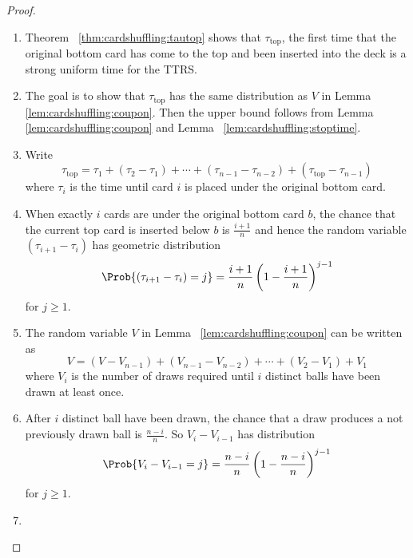 \documentclass[12pt]{article}
\begin{document}
\begin{proof}
    \begin{enumerate}
        \item
            Theorem~%
            \ref{thm:cardshuffling:tautop} shows that \( \tau_{\text{top}}
            \), the first time that the original bottom card has come to
            the top and been inserted into the deck is a strong uniform
            time for the TTRS\@.
        \item
            The goal is to show that \( \tau_{\text{top}} \) has the
            same distribution as \( V \) in Lemma~%
            \ref{lem:cardshuffling:coupon}.  Then the upper bound
            follows from Lemma~%
            \ref{lem:cardshuffling:coupon} and Lemma~%
            \ref{lem:cardshuffling:stoptime}.
        \item
            Write
            \[
                \tau_{\text{top}} = \tau_1 + (\tau_2 - \tau_1) + \cdots
                + (\tau_{n-1} - \tau_{n-2}) + (\tau_{\text{top}} - \tau_
                {n-1})
            \] where \( \tau_i \) is the time until card \( i \) is
            placed under the original bottom card.
        \item
            When exactly \( i \) cards are under the original bottom
            card \( b \), the chance that the current top card is
            inserted below \( b \) is \( \frac{i+1}{n} \) and hence the
            random variable \( (\tau_{i+1} - \tau_i) \) has geometric
            distribution
            \[
                \Prob{(\tau_{i+1} - \tau_i) = j} = \frac{i+1}{n}\left(1
                - \frac{i+1}{n} \right)^{j-1}
            \] for \( j \ge 1 \).
        \item
            The random variable \( V \) in Lemma~%
            \ref{lem:cardshuffling:coupon} can be written as
            \[
                V = (V - V_{n-1}) + (V_{n-1} - V_{n-2}) + \cdots + (V_2
                - V_1) + V_1
            \] where \( V_i \) is the number of draws required until \(
            i \) distinct balls have been drawn at least once.
        \item
            After \( i \) distinct ball have been drawn, the chance that
            a draw produces a not previously drawn ball is \( \frac{n-i}
            {n} \).  So \( V_i - V_{i-1} \) has distribution
            \[
                \Prob{V_i - V_{i-1} = j} = \frac{n-i}{n} \left( 1 -
                \frac{n-i}{n} \right)^{j-1}
            \] for \( j \ge 1 \).
        \item

\end{enumerate}
\end{proof}
\end{document}
